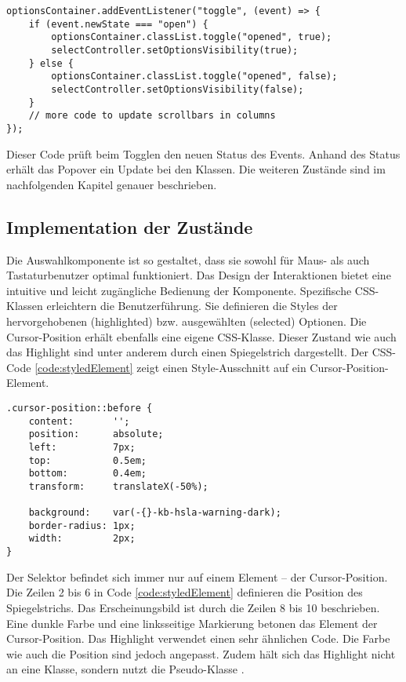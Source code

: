 \begin{lstlisting}[style = htmlcssjs, caption = Event-Handling für Popover-Toggle, label = code:popoverToggle]
optionsContainer.addEventListener("toggle", (event) => {
    if (event.newState === "open") {
        optionsContainer.classList.toggle("opened", true);
        selectController.setOptionsVisibility(true);
    } else {
        optionsContainer.classList.toggle("opened", false);
        selectController.setOptionsVisibility(false);
    }
    // more code to update scrollbars in columns
});
\end{lstlisting}

Dieser Code prüft beim Togglen den neuen Status des Events. 
Anhand des Status erhält das Popover ein Update bei den Klassen. 
Die weiteren Zustände sind im nachfolgenden Kapitel genauer beschrieben. 


\subsection{Implementation der Zustände}
\label{sec:implementStates}

Die Auswahlkomponente ist so gestaltet, dass sie sowohl für Maus- als auch Tastaturbenutzer optimal funktioniert. 
Das Design der Interaktionen bietet eine intuitive und leicht zugängliche Bedienung der Komponente. 
Spezifische CSS-Klassen erleichtern die Benutzerführung. 
Sie definieren die Styles der hervorgehobenen (highlighted) bzw. ausgewählten (selected) Optionen. 
Die Cursor-Position erhält ebenfalls eine eigene CSS-Klasse. 
Dieser Zustand wie auch das Highlight sind unter anderem durch einen Spiegelstrich dargestellt. 
Der CSS-Code \ref{code:styledElement} zeigt einen Style-Ausschnitt auf ein Cursor-Position-Element. 

\begin{lstlisting}[style = htmlcssjs, caption = Spiegelstrich der Cursor-Position, label = code:styledElement]
.cursor-position::before {
    content:       '';
    position:      absolute;
    left:          7px;
    top:           0.5em;
    bottom:        0.4em;
    transform:     translateX(-50%);

    background:    var(-{}-kb-hsla-warning-dark);
    border-radius: 1px;
    width:         2px;
}
\end{lstlisting}

Der Selektor  befindet sich immer nur auf einem Element – der Cursor-Position. 
Die Zeilen 2 bis 6 in Code \ref{code:styledElement} definieren die Position des Spiegelstrichs. 
Das Erscheinungsbild ist durch die Zeilen 8 bis 10 beschrieben. 
Eine dunkle Farbe und eine linksseitige Markierung betonen das Element der Cursor-Position. 
Das Highlight verwendet einen sehr ähnlichen Code. 
Die Farbe wie auch die Position sind jedoch angepasst. 
Zudem hält sich das Highlight nicht an eine Klasse, sondern nutzt die Pseudo-Klasse . 

